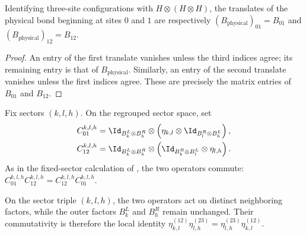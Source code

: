 \begin{lemma}
    \label{thm:mpdo_three_site_pair_lifts}
    \leanok
    Identifying three-site configurations with
    $H\otimes(H\otimes H)$, the translates of the physical bond beginning at
    sites $0$ and $1$ are respectively
    $(B_{\mathrm{physical}})_{01}=B_{01}$ and
    $(B_{\mathrm{physical}})_{12}=B_{12}$.
\end{lemma}

\begin{proof}
    \leanok
    An entry of the first translate vanishes unless the third indices agree;
    its remaining entry is that of $B_{\mathrm{physical}}$. Similarly, an
    entry of the second translate vanishes unless the first indices agree.
    These are precisely the matrix entries of $B_{01}$ and $B_{12}$.
\end{proof}

\begin{lemma}
    \label{thm:mpdo_fixed_sector_adjacent_bonds_comm}
    \leanok
    Fix sectors $(k,l,h)$. On the regrouped sector space, set
    \begin{align}
        C_{01}^{k,l,h}
         & =\Id_{B_k^L\otimes B_h^R}\otimes
        \left(\eta_{k,l}\otimes
        \Id_{B_l^R\otimes B_h^L}\right),
        \notag                              \\
        C_{12}^{k,l,h}
         & =\Id_{B_k^L\otimes B_h^R}\otimes
        \left(\Id_{B_k^R\otimes B_l^L}\otimes\eta_{l,h}\right).
        \notag
    \end{align}
    As in the fixed-sector calculation of
    \cite[Appendix~C.2, Proposition~C.8, lines~1589--1593]
    {Cirac2016MPDO_arXiv}, the two operators commute:
    $C_{01}^{k,l,h}C_{12}^{k,l,h}
        =C_{12}^{k,l,h}C_{01}^{k,l,h}$.
\end{lemma}

On the sector triple $(k,l,h)$, the two operators act on distinct neighboring
factors, while the outer factors $B_k^L$ and $B_h^R$ remain unchanged. Their
commutativity is therefore the local identity
$\eta_{k,l}^{(12)}\eta_{l,h}^{(23)}
    =\eta_{l,h}^{(23)}\eta_{k,l}^{(12)}$.

